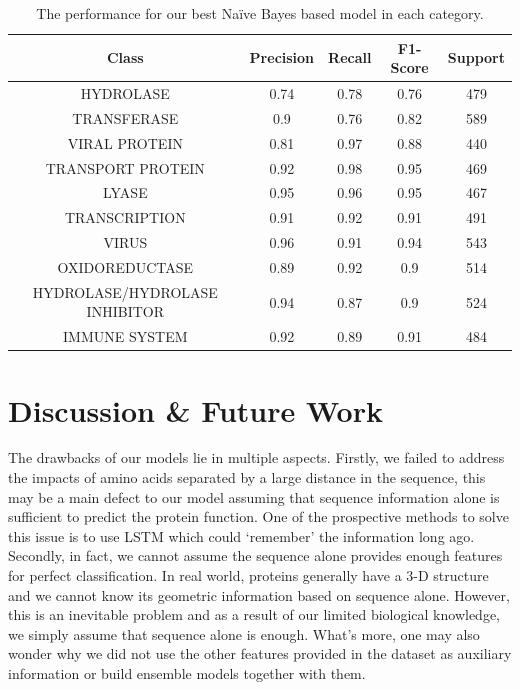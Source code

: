 \documentclass[sigconf]{acmart}
\begin{document}
\begin{table}
  \centering
  \caption{The performance for our best Naïve Bayes based model in each category.}
  \label{tab}
  \begin{tabular}{c|c|c|c|c}
    \toprule
    Class & Precision & Recall & F1-Score & Support \\
    \midrule
    HYDROLASE & 0.74 & 0.78 & 0.76 & 479\\
    TRANSFERASE & 0.9 & 0.76 & 0.82 & 589\\
    VIRAL PROTEIN & 0.81 & 0.97 & 0.88 & 440\\
    TRANSPORT PROTEIN & 0.92 & 0.98 & 0.95 & 469\\
    LYASE & 0.95 & 0.96 & 0.95 & 467\\
    TRANSCRIPTION & 0.91 & 0.92 & 0.91 & 491\\
    VIRUS & 0.96 & 0.91 & 0.94 & 543\\
    OXIDOREDUCTASE & 0.89 & 0.92 & 0.9 & 514\\
    HYDROLASE/HYDROLASE INHIBITOR & 0.94 & 0.87 & 0.9 & 524\\
    IMMUNE SYSTEM & 0.92 & 0.89 & 0.91 & 484\\  
  \bottomrule
\end{tabular}
\end{table}

\section{Discussion & Future Work}
The drawbacks of our models lie in multiple aspects. Firstly, we failed to address the impacts of amino acids separated by a large distance in the sequence, this may be a main defect to our model assuming that sequence information alone is sufficient to predict the protein function. One of the prospective methods to solve this issue is to use LSTM which could ‘remember’ the information long ago. Secondly, in fact, we cannot assume the sequence alone provides enough features for perfect classification. In real world, proteins generally have a 3-D structure and we cannot know its geometric information based on sequence alone. However, this is an inevitable problem and as a result of our limited biological knowledge, we simply assume that sequence alone is enough. What’s more, one may also wonder why we did not use the other features provided in the dataset as auxiliary information or build ensemble models together with them.

\newpage


\end{document}
